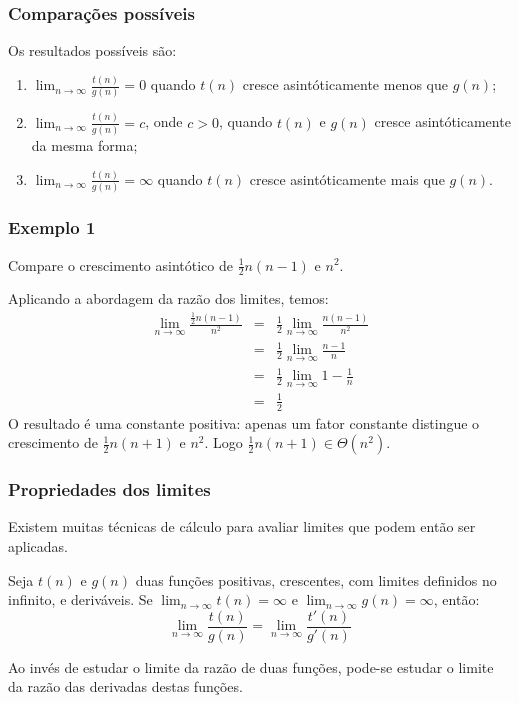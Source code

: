 \documentclass{beamer}
\begin{document}
\begin{frame}
\frametitle{Comparações possíveis}
Os resultados possíveis são:
\begin{enumerate}
\item $\lim_{n \to \infty} \frac{t(n)}{g(n)} = 0$ quando $t(n)$ cresce asintóticamente menos que $g(n)$;


\item $\lim_{n \to \infty} \frac{t(n)}{g(n)} = c$, onde $c > 0$, quando $t(n)$ e
$g(n)$ cresce asintóticamente da mesma forma;


\item $\lim_{n \to \infty} \frac{t(n)}{g(n)} = \infty$ quando $t(n)$ cresce asintóticamente mais que $g(n)$.

\end{enumerate}

\end{frame}

\begin{frame}
\frametitle{Exemplo 1}
\begin{problem}
Compare o crescimento asintótico de $\frac{1}{2} n (n-1)$ e $n^2$.
\end{problem}
\pause
\begin{solution}
Aplicando a abordagem da razão dos limites, temos:
\begin{eqnarray*}
\lim_{n \to \infty} \frac{\frac{1}{2} n (n-1)}{n^2} & = & \frac{1}{2} \lim_{n \to \infty} \frac{n (n-1)}{n^2} \\
& = & \frac{1}{2} \lim_{n \to \infty} \frac{n-1}{n} \\
& = & \frac{1}{2} \lim_{n \to \infty} 1 - \frac{1}{n} \\
& = & \frac{1}{2}
\end{eqnarray*}
O resultado é uma constante positiva: apenas um fator constante distingue
o crescimento de $\frac{1}{2} n(n+1)$ e $n^2$. Logo $\frac{1}{2} n (n+1) \in \Theta(n^2)$.
\end{solution}
\end{frame}

\begin{frame}
\frametitle{Propriedades dos limites}
Existem muitas técnicas de cálculo para avaliar limites que podem então ser aplicadas.

\begin{theorem}
  Seja $t(n)$ e $g(n)$ duas funções positivas, crescentes, com limites definidos
  no infinito, e deriváveis.  Se $\lim_{n \to \infty} t(n) = \infty$ e $\lim_{n
    \to \infty} g(n) = \infty$, então:
$$\lim_{n \to \infty} \frac{t(n)}{g(n)} = \lim_{n \to \infty} \frac{t'(n)}{g'(n)}$$
\end{theorem}

Ao invés de estudar o limite da razão de duas funções, pode-se estudar o limite
da razão das derivadas destas funções.
\end{frame}
\end{document}
